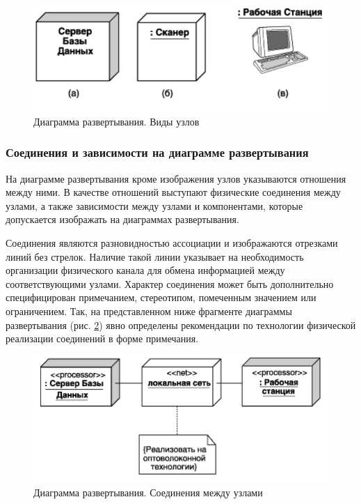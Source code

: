 \documentclass[a4paper,12pt]{report}
\begin{document}
\begin{figure}[h!]
	\centering
	\includegraphics[width=0.5\linewidth]{images/deployementnodes}
	\caption{Диаграмма развертывания. Виды узлов}
	\label{fig:deployementnodes}
\end{figure}


\subsubsection*{Соединения и зависимости на диаграмме развертывания}

На диаграмме развертывания кроме изображения узлов указываются отношения между ними. В качестве отношений выступают физические соединения между узлами, а также зависимости между узлами и компонентами, которые допускается изображать на диаграммах развертывания.

Соединения являются разновидностью ассоциации и изображаются отрезками линий без стрелок. Наличие такой линии указывает на необходимость организации физического канала для обмена информацией между соответствующими узлами. Характер соединения может быть дополнительно специфицирован примечанием, стереотипом, помеченным значением или ограничением. Так, на представленном ниже фрагменте диаграммы развертывания (рис. \ref{fig:deployementbuses}) явно определены рекомендации по технологии физической реализации соединений в форме примечания.

\begin{figure}[h!]
	\centering
	\includegraphics[width=0.5\linewidth]{images/deployementbuses}
	\caption{Диаграмма развертывания. Соединения между узлами}
	\label{fig:deployementbuses}
\end{figure}
\end{document}
